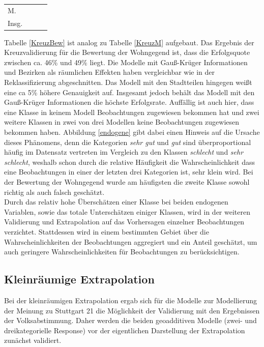\documentclass{Vorlage}
\begin{document}
\begin{table}[h]
\begin{tabular}{lc|ccccccccccccccc}
\multicolumn{2}{l|}{M.}                                                  & \multicolumn{5}{c|}{}                          & \multicolumn{5}{c|}{}                          & \multicolumn{5}{c}{}                        \\
\multicolumn{2}{l|}{Insg.}                                               & \multicolumn{5}{c|}{}                          & \multicolumn{5}{c|}{}                          & \multicolumn{5}{c}{}                        \\ \hline  \hline
\end{tabular}
\end{table}

Tabelle \ref{KreuzBew} ist analog zu Tabelle \ref{KreuzM} aufgebaut. Das Ergebnis der Kreuzvalidierung für die Bewertung der Wohngegend ist, dass die Erfolgsquote zwischen ca. 46\% und 49\% liegt. Die Modelle mit Gauß-Krüger Informationen und Bezirken als räumlichen Effekten haben vergleichbar wie in der Reklassifizierung abgeschnitten. Das Modell mit den Stadtteilen hingegen weißt eine ca 5\% höhere Genauigkeit auf. Insgesamt jedoch behält das Modell mit den Gauß-Krüger Informationen die höchste Erfolgsrate. Auffällig ist auch hier, dass eine Klasse in keinem Modell Beobachtungen zugewiesen bekommen hat und zwei weitere Klassen in zwei von drei Modellen keine Beobachtungen zugewiesen bekommen haben. Abbildung \ref{endogene} gibt dabei einen Hinweis auf die Ursache dieses Phänomens, denn die Kategorien \textit{sehr gut} und \textit{gut} sind überproportional häufig im Datensatz vertreten im Vergleich zu den Klassen \textit{schlecht} und \textit{sehr schlecht}, weshalb schon durch die relative Häufigkeit die Wahrscheinlichkeit dass eine Beobachtungen in einer der letzten drei Kategorien ist, sehr klein wird. Bei der Bewertung der Wohngegend wurde am häufigsten die zweite Klasse sowohl richtig als auch falsch geschätzt.\\
Durch das relativ hohe Überschätzen einer Klasse bei beiden endogenen Variablen, sowie das totale Unterschätzen einiger Klassen, wird in der weiteren Validierung und Extrapolation auf das Vorhersagen einzelner Beobachtungen verzichtet. Stattdessen wird in einem bestimmten Gebiet über die Wahrscheinlichkeiten der Beobachtungen aggregiert und ein Anteil geschätzt, um auch geringere Wahrscheinlichkeiten für Beobachtungen zu berücksichtigen.

\subsection{Kleinräumige Extrapolation}
Bei der kleinräumigen Extrapolation ergab sich für die Modelle zur Modellierung der Meinung zu Stuttgart 21 die Möglichkeit der Validierung mit den Ergebnissen der Volksabstimmung. Daher werden die beiden geoadditiven Modelle (zwei- und dreikategorielle Response) vor der eigentlichen Darstellung der Extrapolation zunächst validiert.
\end{document}
